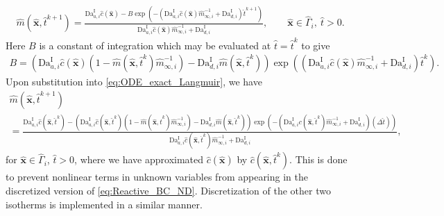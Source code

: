 \documentclass[preprint, 1p, authoryear]{elsarticle}
\begin{document}
\begin{align}
\hat{m}(\hat{\mathbf{x}}, \hat{t}^{k+1}) =\frac{ \mathrm{Da}^{\textrm{I}}_{a,i} \hat{c}(\hat{\mathbf{x}}) - B\exp\left(-\left(\mathrm{Da}^{\textrm{I}}_{a,i} \hat{c}(\hat{\mathbf{x}}) \hat{m}_{\infty,i}^{-1} +\mathrm{Da}^{\textrm{I}}_{d,i} \right) \hat{t}^{k+1} \right) }{ \mathrm{Da}^{\textrm{I}}_{a,i} \hat{c}(\hat{\mathbf{x}}) \hat{m}_{\infty,i}^{-1} + \mathrm{Da}^{\textrm{I}}_{d,i}}, \qquad \hat{\mathbf{x}} \in \hat{\Gamma}_i, \: \hat{t}>0. \label{eq:ODE_exact_Langmuir}
\end{align}
Here  $B$ is a constant of integration which may be evaluated at $\hat{t}=\hat{t}^{k}$ to give
\begin{align}
B = \left( \mathrm{Da}^{\textrm{I}}_{a,i} \hat{c}(\hat{\mathbf{x}}) \left( 1 - \hat{m}(\hat{\mathbf{x}}, \hat{t}^{k}) \hat{m}_{\infty,i}^{-1}\right) -\mathrm{Da}^{\textrm{I}}_{d,i} \hat{m}(\hat{\mathbf{x}}, \hat{t}^{k}) \right)\exp\left(\left(\mathrm{Da}^{\textrm{I}}_{a,i} \hat{c}(\hat{\mathbf{x}}) \hat{m}_{\infty,i}^{-1} +\mathrm{Da}^{\textrm{I}}_{d,i}\right) \hat{t}^{k} \right) . \label{eq:M_exact}
\end{align}
Upon substitution into  \eqref{eq:ODE_exact_Langmuir}, we have
{\small
\begin{multline}
\hat{m}(\hat{\mathbf{x}},\hat{t}^{k+1}) \\= \frac{ \mathrm{Da}^{\textrm{I}}_{a,i} \hat{c}(\hat{\mathbf{x}},\hat{t}^{k}) - \left( \mathrm{Da}^{\textrm{I}}_{a,i}\hat{c}(\hat{\mathbf{x}}, \hat{t}^{k}) \left( 1 - \hat{m}(\hat{\mathbf{x}}, \hat{t}^{k})\hat{m}_{\infty,i}^{-1} \right) - \mathrm{Da}^{\textrm{I}}_{d,i} \hat{m}(\hat{\mathbf{x}}, \hat{t}^{k}) \right)\exp\left( -\left( \mathrm{Da}^{\textrm{I}}_{a,i} c(\hat{\mathbf{x}}, \hat{t}^{k}) \hat{m}_{\infty,i}^{-1} +\mathrm{Da}^{\textrm{I}}_{d,i}\right) (\Delta \hat{t}) \right)}{\mathrm{Da}^{\textrm{I}}_{a,i} \hat{c}(\hat{\mathbf{x}}, \hat{t}^{k}) \hat{m}_{\infty,i}^{-1} + \mathrm{Da}^{\textrm{I}}_{d,i}}, \label{eq:Solution_to_M}
\end{multline}}for $\hat{\mathbf{x}} \in \hat{\Gamma}_i$, $\hat{t}>0$, 
where we have approximated $\hat{c}(\hat{\mathbf{x}})$ by $\hat{c}(\hat{\mathbf{x}}, \hat{t}^{k})$. This is done to prevent nonlinear terms in unknown variables from appearing in the discretized version of \eqref{eq:Reactive_BC_ND}.  Discretization of the other two isotherms is implemented in a similar manner. 
\end{document}
